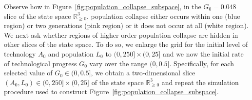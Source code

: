 \documentclass[a4paper,fleqn]{cas-sc}
\begin{document}
Observe how in Figure~\ref{fig:population_collapse_subspace}, in the $G_0=0.048$ slice of the state space $\mathbb{R}^3_{\geq0}$, population collapse either occurs within one (blue region) or two generations (pink region) or it does not occur at all (white region).
We next ask whether regions of higher-order population collapse are hidden in other slices of the state space.
To do so, we enlarge the grid for the initial level of technology $A_0$ and population $L_0$ to $(0,250]\times(0,25]$ and we now the initial rate of technological progress $G_0$ vary over the range $(0,0.5]$. 
Specifically, for each selected value of $G_0\in(0,0.5]$, we obtain a two-dimensional slice $(A_0,L_0)\in(0,250]\times(0,25]$ of the state space $\mathbb{R}^3_{\geq0}$ and repeat the simulation procedure used to construct Figure~\ref{fig:population_collapse_subspace}. 
\end{document}
